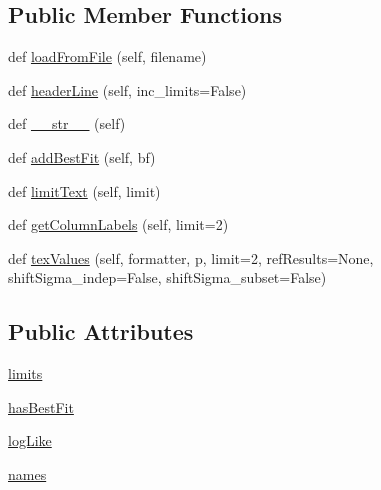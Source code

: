 \subsection*{Public Member Functions}
\begin{DoxyCompactItemize}
\item 
def \mbox{\hyperlink{classgetdist_1_1types_1_1MargeStats_a9192b3334c2fc85bbe5fec3ca93af501}{load\+From\+File}} (self, filename)
\item 
def \mbox{\hyperlink{classgetdist_1_1types_1_1MargeStats_a2ddab13aed8fe2159f0a4d742bdad5c9}{header\+Line}} (self, inc\+\_\+limits=False)
\item 
def \mbox{\hyperlink{classgetdist_1_1types_1_1MargeStats_ae9efeba91d3389c8a961b100fda0ec1c}{\+\_\+\+\_\+str\+\_\+\+\_\+}} (self)
\item 
def \mbox{\hyperlink{classgetdist_1_1types_1_1MargeStats_aaab0b35dae558f300d311c2baaf1237c}{add\+Best\+Fit}} (self, bf)
\item 
def \mbox{\hyperlink{classgetdist_1_1types_1_1MargeStats_a08ede992eb83354249dfd689e1f3d9bf}{limit\+Text}} (self, limit)
\item 
def \mbox{\hyperlink{classgetdist_1_1types_1_1MargeStats_a739268ba287cfaad79b4ba5039e832e8}{get\+Column\+Labels}} (self, limit=2)
\item 
def \mbox{\hyperlink{classgetdist_1_1types_1_1MargeStats_af205f6fbc53eabcc4c0138def3b93d30}{tex\+Values}} (self, formatter, p, limit=2, ref\+Results=None, shift\+Sigma\+\_\+indep=False, shift\+Sigma\+\_\+subset=False)
\end{DoxyCompactItemize}
\subsection*{Public Attributes}
\begin{DoxyCompactItemize}
\item 
\mbox{\hyperlink{classgetdist_1_1types_1_1MargeStats_ad142a853feed3abbaf5cf0091738cd25}{limits}}
\item 
\mbox{\hyperlink{classgetdist_1_1types_1_1MargeStats_aa7e7220cfe462787b27c03ccad196465}{has\+Best\+Fit}}
\item 
\mbox{\hyperlink{classgetdist_1_1types_1_1MargeStats_aaaff41d01ed24c08ade7120b76cfa48c}{log\+Like}}
\item 
\mbox{\hyperlink{classgetdist_1_1types_1_1MargeStats_ab9f94797de11f4e1b82446417f86c114}{names}}
\end{DoxyCompactItemize}


